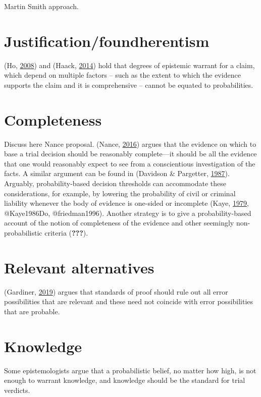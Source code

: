 \documentclass[]{book}
\begin{document}
Martin Smith approach.

\section{Justification/foundherentism}

(Ho, \protect\hyperlink{ref-ho2008philosophy}{2008}) and (Haack, \protect\hyperlink{ref-Haack2014-HAAEMS}{2014})
hold that degrees of epistemic warrant for a claim, which depend
on multiple factors -- such as the extent to which the evidence
supports the claim and it is comprehensive -- cannot be equated
to probabilities.

\section{Completeness}

Discuss here Nance proposal. (Nance, \protect\hyperlink{ref-nance2016}{2016}) argues that the evidence on which to base a trial decision should be reasonably complete---it should be all the evidence that one would reasonably expect to see from a conscientious investigation of the facts. A similar argument can be found in (Davidson \& Pargetter, \protect\hyperlink{ref-davidsonpargetter1987}{1987}). Arguably, probability-based decision thresholds can accommodate these considerations, for example, by lowering the probability of civil or criminal liability whenever the body of evidence is one-sided or incomplete (Kaye, \protect\hyperlink{ref-Kaye79gate}{1979}, @Kaye1986Do, @friedman1996). Another strategy is to give a probability-based account of the notion of completeness of the evidence and other seemingly non-probabilistic criteria ({\textbf{???}}).

\section{Relevant alternatives}

(Gardiner, \protect\hyperlink{ref-gardiner2019ppa}{2019}) argues that standards of proof should rule out all error possibilities that are relevant and these need not coincide with error possibilities that are probable.

\section{Knowledge}

Some epistemologists argue that a probabilistic belief, no matter how high, is not enough to warrant knowledge, and knowledge should be the standard for trial verdicts.
\end{document}
